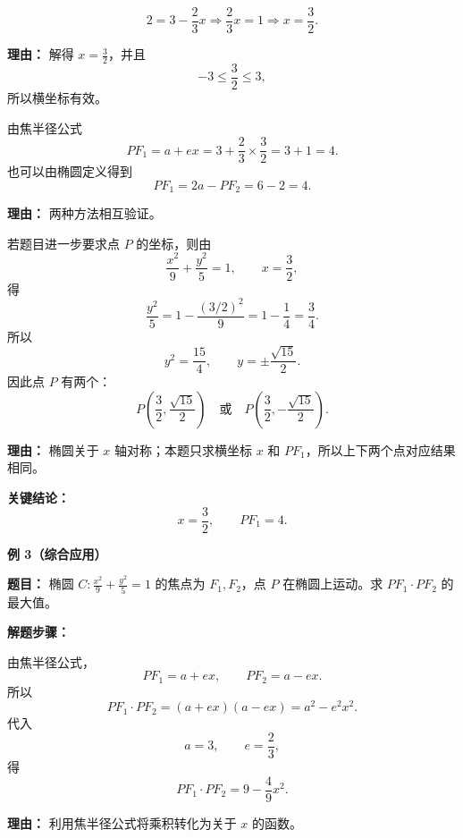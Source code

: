 \begin{examplebox}
\begin{description}[style=nextline, leftmargin=2.8em, labelsep=0.5em, itemsep=0.45em]
		\item[\textbf{第二步（解方程求 $x$）：}]
		      \[
			      2=3-\frac{2}{3}x
			      \Rightarrow \frac{2}{3}x=1
			      \Rightarrow x=\frac{3}{2}.
		      \]
		      \par\textbf{理由：} 解得 $x=\frac{3}{2}$，并且
		      \[
			      -3\le \frac{3}{2}\le 3,
		      \]
		      所以横坐标有效。

		\item[\textbf{第三步（求 $PF_1$）：}] 由焦半径公式
		      \[
			      PF_1=a+ex
			      =3+\frac{2}{3}\times\frac{3}{2}
			      =3+1
			      =4.
		      \]
		      也可以由椭圆定义得到
		      \[
			      PF_1=2a-PF_2=6-2=4.
		      \]
		      \par\textbf{理由：} 两种方法相互验证。

		\item[\textbf{第四步（说明点 $P$ 不唯一）：}] 若题目进一步要求点 $P$ 的坐标，则由
		      \[
			      \frac{x^2}{9}+\frac{y^2}{5}=1,\qquad x=\frac{3}{2},
		      \]
		      得
		      \[
			      \frac{y^2}{5}=1-\frac{(3/2)^2}{9}
			      =1-\frac{1}{4}
			      =\frac{3}{4}.
		      \]
		      所以
		      \[
			      y^2=\frac{15}{4},\qquad y=\pm\frac{\sqrt{15}}{2}.
		      \]
		      因此点 $P$ 有两个：
		      \[
			      P\left(\frac{3}{2},\frac{\sqrt{15}}{2}\right)
			      \quad\text{或}\quad
			      P\left(\frac{3}{2},-\frac{\sqrt{15}}{2}\right).
		      \]
		      \par\textbf{理由：} 椭圆关于 $x$ 轴对称；本题只求横坐标 $x$ 和 $PF_1$，所以上下两个点对应结果相同。
	\end{description}

	\textbf{\textcolor{CExample}{关键结论：}}
	\[
		x=\frac{3}{2},\qquad PF_1=4.
	\]

	\medskip
	\textbf{\textcolor{CExample}{例 3（综合应用）}}

	\textbf{\textcolor{CExample}{题目：}} 椭圆 $C:\frac{x^2}{9}+\frac{y^2}{5}=1$ 的焦点为 $F_1,F_2$，点 $P$ 在椭圆上运动。求 $PF_1\cdot PF_2$ 的最大值。

	\textbf{\textcolor{CExample}{解题步骤：}}
	\begin{description}[style=nextline, leftmargin=2.8em, labelsep=0.5em, itemsep=0.45em]
		\item[\textbf{第一步（表达乘积）：}] 由焦半径公式，
		      \[
			      PF_1=a+ex,\qquad PF_2=a-ex.
		      \]
		      所以
		      \[
			      PF_1\cdot PF_2=(a+ex)(a-ex)=a^2-e^2x^2.
		      \]
		      代入
		      \[
			      a=3,\qquad e=\frac{2}{3},
		      \]
		      得
		      \[
			      PF_1\cdot PF_2=9-\frac{4}{9}x^2.
		      \]
		      \par\textbf{理由：} 利用焦半径公式将乘积转化为关于 $x$ 的函数。


\end{description}
\end{examplebox}
